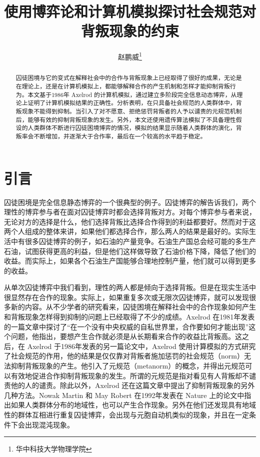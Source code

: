 \documentclass[lang=cn,11pt]{elegantpaper}
\title{使用博弈论和计算机模拟探讨社会规范对背叛现象的约束}
\author{赵鹏威\footnote{华中科技大学物理学院}}
\begin{document}
	
	\maketitle
	
	\begin{abstract}
		\noindent 囚徒困境与它的变式在解释社会中的合作与背叛现象上已经取得了很好的成果，无论是在理论上，还是在计算机模拟上，都能够解释合作的产生机制和怎样才能抑制背叛行为。本文基于1986年 Axelrod 的计算机模拟，通过建立多阶段完全信息动态博弈，从理论上证明了计算机模拟结果的正确性。分析表明，在只具备社会规范的人类群体中，背叛现象不能得到抑制。当引入了对不愿意、拒绝惩罚背叛者的人予以谴责的元规范机制后，能够有效的抑制背叛现象的发生。另外，本文还使用遗传算法模拟了不具备理性假设的人类群体不断进行囚徒困境博弈的情况，模拟的结果显示随着人类群体的演化，背叛率会不断增加，并逐渐大于合作率，最后在一个较高的水平趋于稳定。
	\end{abstract}

\section{引言}\label{sec:Intro}
囚徒困境是完全信息静态博弈的一个很典型的例子。囚徒博弈的解告诉我们，两个理性的博弈参与者在面对囚徒博弈时都会选择背叛对方。对每个博弈参与者来说，无论对方的选择是什么，他们选择背叛比选择合作得到的利益都要好。然而对于这两个人组成的整体来讲，如果他们都选择合作，那么两人的结果是最好的。实际生活中有很多囚徒博弈的例子，如石油的产量竞争。石油生产国总会经可能的多生产石油，试图获得更高的利益，但是他们这样做导致了石油价格下降，降低了他们的收益。而实际上，如果各个石油生产国能够合理地控制产量，他们就可以得到更多的收益。

从单次囚徒博弈中我们看到，理性的两人都是倾向于选择背叛。但是在现实生活中很显然存在合作的现象。实际上，如果重复多次或无限次囚徒博弈，就可以发现很多新的内容。从不少学者的研究看来，囚徒困境在解释社会中的合作现象如何产生和背叛现象怎样得到抑制的问题上已经取得了不少的成绩。Axelrod 在1981年发表的一篇文章\cite{axelrod1981evolution}中探讨了“在一个没有中央权威的自私世界里，合作要如何才能出现”这个问题，他指出，要想产生合作就必须是从长期看来合作的收益比背叛高。这之后，在 Axelrod 于1986年发表的另一篇论文\cite{Axelrod1986}中，Axelrod 使用计算模拟的方式研究了社会规范的作用，他的结果是仅仅靠对背叛者施加惩罚的社会规范（norm）无法抑制背叛现象的产生。他引入了元规范（metanorm）的概念，并得出元规范可以有效地促进合作抑制背叛现象的发生。所谓的元规范是指对看见有人背叛却不谴责他的人的谴责。除此以外，Axelrod 还在这篇文章中提出了抑制背叛现象的另外几种方法。Nowak Martin 和 May Robert 在1992年发表在 Nature 上的论文\cite{1992Nature}中指出如果人类群体分布的地域性，也可以产生合作现象。另外在他们还发现具有地域性的群体互相进行重复囚徒博弈，会出现与元胞自动机类似的现象，并且在一定条件下会出现混沌现象。
\end{document}
